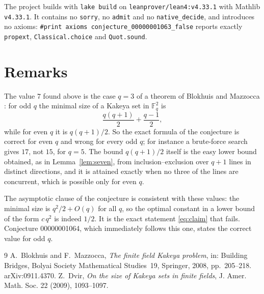 \documentclass[11pt]{article}
\theoremstyle{plain}
\theoremstyle{definition}
\theoremstyle{remark}
\newcommand{\F}{\mathbb F}
\begin{document}
The project builds with \texttt{lake build} on
\texttt{leanprover/lean4:v4.33.1} with Mathlib \texttt{v4.33.1}. It contains
no \texttt{sorry}, no \texttt{admit} and no \texttt{native\_decide}, and
introduces no axioms: \texttt{\#print axioms
conjecture\_00000001063\_false} reports exactly \texttt{propext},
\texttt{Classical.choice} and \texttt{Quot.sound}.

\section{Remarks}\label{sec:remarks}

The value $7$ found above is the case $q=3$ of a theorem of Blokhuis and
Mazzocca \cite{bm}: for odd $q$ the minimal size of a Kakeya set in $\F_q^2$ is
\[
  \frac{q(q+1)}2+\frac{q-1}2,
\]
while for even $q$ it is $q(q+1)/2$. So the exact formula of the conjecture is
correct for even $q$ and wrong for every odd $q$; for instance a brute-force
search gives $17$, not $15$, for $q=5$. The bound $q(q+1)/2$ itself is the
easy lower bound obtained, as in Lemma~\ref{lem:seven}, from inclusion--exclusion
over $q+1$ lines in distinct directions, and it is attained exactly when no
three of the lines are concurrent, which is possible only for even $q$.

The asymptotic clause of the conjecture is consistent with these values: the
minimal size is $q^2/2+O(q)$ for all $q$, so the optimal constant in a lower
bound of the form $c\,q^2$ is indeed $1/2$. It is the exact statement
\eqref{eq:claim} that fails. Conjecture 00000001064, which immediately follows
this one, states the correct value for odd $q$.

\begin{thebibliography}{9}
 A.~Blokhuis and F.~Mazzocca, \emph{The finite field Kakeya
  problem}, in: Building Bridges, Bolyai Society Mathematical Studies~19,
  Springer, 2008, pp.~205--218. arXiv:0911.4370.
 Z.~Dvir, \emph{On the size of Kakeya sets in finite fields},
  J. Amer. Math. Soc. 22 (2009), 1093--1097.
\end{thebibliography}
\end{document}
